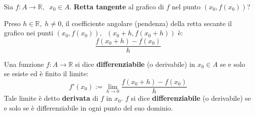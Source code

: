 \documentclass[a4paper]{article}
\theoremstyle{break}
\theoremstyle{break}
\theoremstyle{break}
\theoremstyle{break}
\begin{document}
Sia \( f: A \to \mathbb{R},\;\;x_0 \in A \). \textbf{Retta tangente} al grafico di \( f \) nel
punto \( (x_0, f(x_0)) \)?
\begin{figure}[H]
  \begin{center}
  \end{center}
\end{figure}
Preso \( h \in \mathbb{R},\; h \neq 0 \), il coefficiente angolare (pendenza) della retta secante
il grafico nei punti \( (x_0, f(x_0)), \;\; (x_0+h, f(x_0+h)) \) è:
\[
  \frac{f(x_0+h)-f(x_0)}{h}
\]

\begin{definition}
  Una funzione \( f: A \to \mathbb{R} \) si dice \textbf{differenziabile} (o derivabile)
  in \( x_0 \in A \) se e solo se esiste ed è finito il limite:
  \[
    f'(x_0):= \lim_{h \to 0} \frac{f(x_0+h)-f(x_0)}{h}
  \]
  Tale limite è detto \textbf{derivata} di \( f \) in \( x_0 \). \( f \) si dice
  \textbf{differenziabile} (o derivabile) se e solo se è differenziabile in ogni punto
  del suo dominio.
\end{definition}
\end{document}
